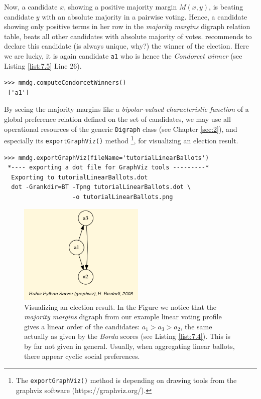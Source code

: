 Now, a candidate $x$, showing a positive majority margin $M(x,y)$, is beating candidate $y$  with an absolute majority in a pairwise voting. Hence, a candidate showing only positive terms in her row in the \emph{majority margins} digraph relation table, beats all other candidates with absolute majority of votes. \Condorcet recommends to declare this candidate (is always unique, why?) the winner of the election. Here we are lucky, it is again candidate \texttt{a1} who is hence the \emph{Condorcet winner} (see Listing \ref{list:7.5} Line 26).
\begin{lstlisting}
>>> mmdg.computeCondorcetWinners()
 ['a1']  
\end{lstlisting}    

By seeing the majority margins like a \emph{bipolar-valued characteristic function} of a global preference relation defined on the set of candidates, we may use all operational resources of the generic \texttt{Digraph} class (see Chapter \ref{sec:2}), and especially its \texttt{exportGraphViz()} method \footnote{The \texttt{exportGraphViz()} method is depending on drawing tools from the graphviz software (https://graphviz.org/).}, for visualizing an election result.
\begin{lstlisting}
>>> mmdg.exportGraphViz(fileName='tutorialLinearBallots')
 *---- exporting a dot file for GraphViz tools ---------*
  Exporting to tutorialLinearBallots.dot
  dot -Grankdir=BT -Tpng tutorialLinearBallots.dot \
                   -o tutorialLinearBallots.png
\end{lstlisting}
\begin{figure}[h]
\sidecaption[t]
\includegraphics[width=6cm]{Figures/tutorialLinearBallots.png}
\caption{Visualizing an election result. In the Figure we notice that the \emph{majority margins} digraph from our example linear voting profile gives a linear order of the candidates: $a_1 > a_3 > a_2$, the same actually as given by the \emph{Borda} scores (see Listing \ref{list:7.4}). This is by far not given in general. Usually, when aggregating linear ballots, there appear cyclic social preferences.
}
\label{fig:7.1}       %
\end{figure}

